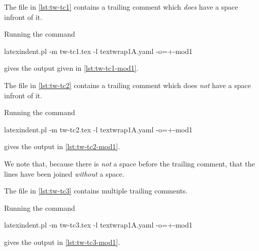  \begin{example}
 The file in \cref{lst:tw-tc1} contains a trailing comment which \emph{does} have a space
 infront of it.

 Running the command
 \begin{commandshell}
latexindent.pl -m tw-tc1.tex -l textwrap1A.yaml -o=+-mod1 
\end{commandshell}
 gives the output given in \cref{lst:tw-tc1-mod1}.

 \begin{cmhtcbraster}[raster column skip=.1\linewidth]
 \end{cmhtcbraster}
 \end{example}

 \begin{example}
 The file in \cref{lst:tw-tc2} contains a trailing comment which does \emph{not} have a
 space infront of it.

 Running the command
 \begin{commandshell}
latexindent.pl -m tw-tc2.tex -l textwrap1A.yaml -o=+-mod1 
\end{commandshell}
 gives the output in \cref{lst:tw-tc2-mod1}.
 \begin{cmhtcbraster}[raster column skip=.1\linewidth]
 \end{cmhtcbraster}
 We note that, because there is \emph{not} a space before the trailing comment, that the
 lines have been joined \emph{without} a space.
 \end{example}

 \begin{example}
 The file in \cref{lst:tw-tc3} contains multiple trailing comments.

 Running the command
 \begin{commandshell}
latexindent.pl -m tw-tc3.tex -l textwrap1A.yaml -o=+-mod1 
\end{commandshell}
 gives the output in \cref{lst:tw-tc3-mod1}.
 \begin{cmhtcbraster}[raster column skip=.1\linewidth]
 \end{cmhtcbraster}
 \end{example}

